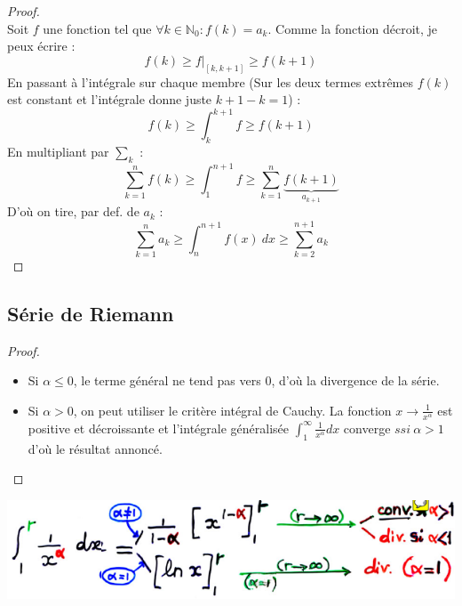 \documentclass[11pt, a4paper, openany]{book}
\begin{document}
\begin{proof}
	\ \\
	Soit $f$ une fonction tel que $\forall k \in \mathbb{N}_0 : f(k) = a_k$. Comme la fonction décroit, je peux  écrire :
	\begin{equation}
		f(k) \geq f|_{[k, k+1]} \geq f(k+1)
	\end{equation}
	En passant à l'intégrale sur chaque membre (Sur les deux termes extrêmes $f(k)$ est constant et l'intégrale donne juste $k+1-k = 1$) :
	\begin{equation}
		f(k) \geq \int_k^{k+1} f \geq f(k+1)
	\end{equation}
	En multipliant par $\sum_k$ :
	\begin{equation}
		\sum_{k=1}^n f(k) \geq \int_1^{n+1} f \geq \sum_{k=1}^n \underbrace{f(k+1)}_{a_{k+1}}
	\end{equation}
	D'où on tire, par def. de $a_k$ :
	\begin{equation}
		\sum_{k=1}^n a_k \geq \int_n^{n+1} f(x)\ dx \geq \sum_{k=2}^{n+1} a_k
	\end{equation}
\end{proof}
			
\setcounter{subsection}{4}
\subsection{Série de Riemann}
\begin{proof}\ \\
	\begin{itemize}
		\item Si $\alpha \leq 0$, le terme général ne tend pas vers 0, d'où la divergence de la série.
		\item Si $\alpha > 0$, on peut utiliser le critère intégral de Cauchy. La fonction $x \rightarrow \frac{1}{x^\alpha}$  est positive et décroissante et l'intégrale généralisée $\int_1^\infty \frac{1}{x^\alpha}dx$ converge $ssi\ \alpha > 1$ d'où le résultat annoncé.
	\end{itemize}
\end{proof}
\begin{center}
	\includegraphics[scale=0.7]{image7.png}
\end{center}
			
\end{document}
